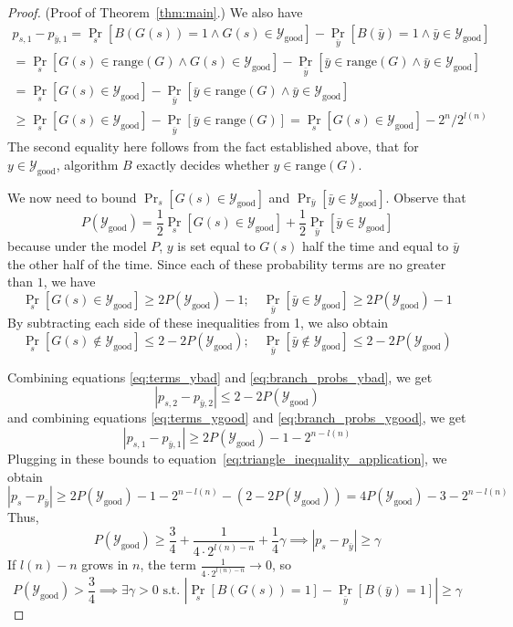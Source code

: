 \documentclass{article}
\def \Ygood{\mathcal{Y}_\text{good}}
\def \by{{\bar{y}}}
\theoremstyle{definition}
\theoremstyle{remark}
\begin{document}
\begin{proof}{(Proof of Theorem~\ref{thm:main}.)}
We also have
\begin{multline} \label{eq:terms_ygood}
p_{s, 1} - p_{\by, 1} =
\Pr_s[B(G(s)) = 1 \wedge G(s) \in \Ygood] - \Pr_\by[B(\by) = 1 \wedge \by \in \Ygood]
 \\
= 
\Pr_s[G(s) \in \text{range}(G) \wedge G(s) \in \Ygood] -
\Pr_\by[\by \in \text{range}(G) \wedge \by \in \Ygood]
\\
= \Pr_s[G(s) \in \Ygood] - \Pr_\by[\by \in \text{range}(G) \wedge \by \in \Ygood] \\
\geq \Pr_s[G(s) \in \Ygood] - \Pr_\by[\by \in \text{range}(G)] 
= \Pr_s[G(s) \in \Ygood] - 2^n/2^{l(n)}
\end{multline}
The second equality here follows from the fact established above, that for $y \in \Ygood$, algorithm $B$ exactly decides whether $y \in \text{range}(G)$.

We now need to bound $\Pr_s[G(s) \in \Ygood]$ and $\Pr_\by[\by \in \Ygood]$.
Observe that
$$
P(\Ygood) = \frac{1}{2}\Pr_s[G(s) \in \Ygood] + \frac{1}{2}\Pr_\by[\by \in \Ygood]
$$
because under the model $P$, $y$ is set equal to $G(s)$ half the time and equal to $\by$ the other half of the time.
Since each of these probability terms are no greater than $1$, we have
\begin{equation} \label{eq:branch_probs_ygood}
\Pr_s[G(s) \in \Ygood] \geq 2P(\Ygood) - 1;
\quad
\Pr_\by[\by \in \Ygood] \geq 2P(\Ygood) - 1        
\end{equation}
By subtracting each side of these inequalities from 1, we also obtain
\begin{equation} \label{eq:branch_probs_ybad}
\Pr_s[G(s) \notin \Ygood] \leq 2 - 2P(\Ygood);
\quad
\Pr_\by[\by \notin \Ygood] \leq 2 - 2P(\Ygood)
\end{equation}

Combining equations \ref{eq:terms_ybad} and \ref{eq:branch_probs_ybad}, we get
$$
|p_{s, 2} - p_{\by, 2}| \leq 2 - 2P(\Ygood)
$$
and combining equations \ref{eq:terms_ygood} and \ref{eq:branch_probs_ygood}, we get
$$
|p_{s, 1} - p_{\by, 1}| \geq 2P(\Ygood) - 1 - 2^{n - l(n)}
$$
Plugging in these bounds to equation~\ref{eq:triangle_inequality_application}, we obtain
\begin{equation}
|p_s - p_\by| \geq
2P(\Ygood) - 1 - 2^{n - l(n)}
- (2 - 2P(\Ygood))
= 4 P(\Ygood) - 3 - 2^{n - l(n)}
\end{equation}
Thus, 
$$
P(\Ygood) \geq \frac{3}{4} + \frac{1}{4 \cdot 2^{l(n) - n}} + \frac{1}{4}\gamma
\implies |p_s - p_\by| \geq \gamma
$$
If $l(n) - n$ grows in $n$, the term $\frac{1}{4 \cdot 2^{l(n) - n}} \to 0$,
so
$$
P(\Ygood) > \frac{3}{4} \implies \exists \gamma > 0 \text{ s.t. } |\Pr_s[B(G(s)) = 1] - \Pr_{\bar{y}}[B(\bar{y}) = 1]| \geq \gamma
$$

\end{proof}
\end{document}
